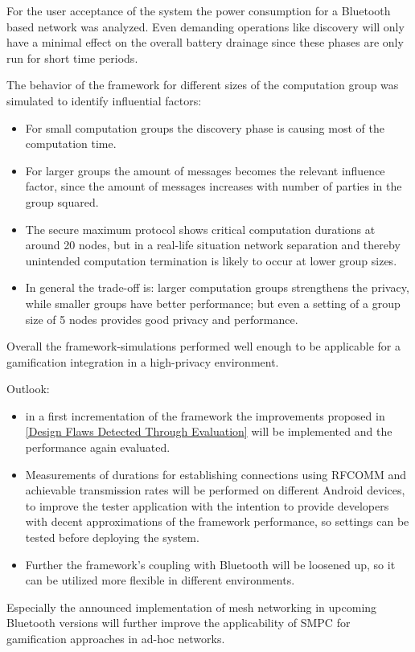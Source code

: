 For the user acceptance of the system the power consumption for a Bluetooth based network was analyzed. Even demanding operations like discovery will only have a minimal effect on the overall battery drainage since these phases are only run for short time periods.

The behavior of the framework for different sizes of the computation group was simulated to identify influential factors:
\begin{itemize}
	\item For small computation groups the discovery phase is causing most of the computation time.
	\item For larger groups the amount of messages becomes the relevant influence factor, since the amount of messages increases with number of parties in the group squared. 
	\item The secure maximum protocol shows critical computation durations at around 20 nodes, but in a real-life situation network separation and thereby unintended computation termination is likely to occur at lower group sizes.
	\item In general the trade-off is: larger computation groups strengthens the privacy, while smaller groups have better performance; but even a setting of a group size of 5 nodes provides good privacy and performance.
\end{itemize}  

Overall the framework-simulations performed well enough to be applicable for a gamification integration in a high-privacy environment.

Outlook:
\begin{itemize}
	\item in a first incrementation of the framework the improvements proposed in \autoref{Design Flaws Detected Through Evaluation} will be implemented and the performance again evaluated.
	\item Measurements of durations for establishing connections using \gls{RFCOMM} and achievable transmission rates will be performed on different Android devices, to improve the tester application with the intention to provide developers with decent approximations of the framework performance, so settings can be tested before deploying the system. 
	\item Further the framework's coupling with Bluetooth will be loosened up, so it can be utilized more flexible in different environments.
\end{itemize}

Especially the announced implementation of mesh networking in upcoming Bluetooth versions will further improve the applicability of \gls{SMPC} for gamification approaches in ad-hoc networks.

\clearpage
\renewcommand{\bibname}{References} %

\begingroup
\sloppy
\printbibliography[heading=bibintoc] %
\endgroup





